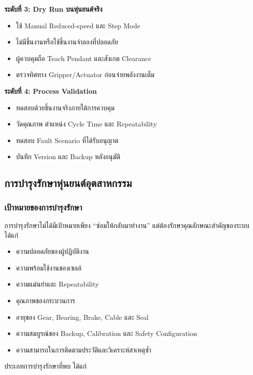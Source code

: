 \textbf{ระดับที่ 3: Dry Run บนหุ่นยนต์จริง}

\begin{itemize}
    \item ใช้ Manual Reduced-speed และ Step Mode
    \item ไม่มีชิ้นงานหรือใช้ชิ้นงานจำลองที่ปลอดภัย
    \item ผู้ควบคุมถือ Teach Pendant และสังเกต Clearance
    \item ตรวจทิศทาง Gripper/Actuator ก่อนจ่ายพลังงานเต็ม
\end{itemize}

\textbf{ระดับที่ 4: Process Validation}

\begin{itemize}
    \item ทดสอบด้วยชิ้นงานจริงภายใต้การควบคุม
    \item วัดคุณภาพ ตำแหน่ง Cycle Time และ Repeatability
    \item ทดสอบ Fault Scenario ที่ได้รับอนุญาต
    \item บันทึก Version และ Backup หลังอนุมัติ
\end{itemize}


\subsection{การบำรุงรักษาหุ่นยนต์อุตสาหกรรม}

\subsubsection{เป้าหมายของการบำรุงรักษา}

การบำรุงรักษาไม่ได้มีเป้าหมายเพียง “ซ่อมให้กลับมาทำงาน” แต่ต้องรักษาคุณลักษณะสำคัญของระบบ ได้แก่

\begin{itemize}
    \item ความปลอดภัยของผู้ปฏิบัติงาน
    \item ความพร้อมใช้งานของเซลล์
    \item ความแม่นยำและ Repeatability
    \item คุณภาพของกระบวนการ
    \item อายุของ Gear, Bearing, Brake, Cable และ Seal
    \item ความสมบูรณ์ของ Backup, Calibration และ Safety Configuration
    \item ความสามารถในการติดตามประวัติและวิเคราะห์สาเหตุซ้ำ
\end{itemize}

ประเภทการบำรุงรักษาที่พบ ได้แก่

